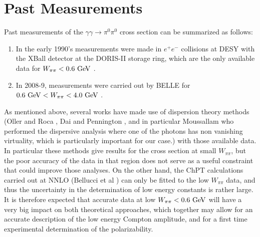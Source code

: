 \section{Past Measurements}
Past measurements of the $\gamma\gamma\to \pi^0\pi^0$ cross section can be
summarized as follows:
\begin{enumerate}
    \item 
In the early 1990's measurements were made in $e^+e^-$ collisions at DESY
with the XBall detector at the DORIS-II storage ring, which are the only
available data for $W_{\pi\pi}<0.6{\rm~ GeV}$ \cite{Marsiske:1990hx}. 
\item In 2008-9, measurements were carried out by BELLE
for $0.6{\rm~ GeV}<W_{\pi\pi}<4.0 {\rm~ GeV}$ \cite{Mori:2007bu,Uehara:2008ep,Uehara:2009cka}. 
\end{enumerate}
As mentioned above, several works have made use of dispersion theory methods
(Oller and
Roca \cite{Oller:2008kf}, Dai and Pennington \cite{Dai:2016ytz}, and
in particular Moussallam \cite{Moussallam:2013una} who performed the
dispersive analysis where one of the photons has non vanishing
virtuality, which is particularly important for our case.) with those
available data. In particular these methods give results for the cross
section at small $W_{\pi\pi}$, but the poor accuracy of the data in
that region does not serve as a useful constraint that could improve
those analyses. On the other hand, the ChPT calculations carried out
at NNLO (Bellucci et al \cite{Bellucci:1994hx,Bellucci:1994eb} ) can
only be fitted to the low $W_{\pi\pi}$ data, and thus the uncertainty
in the determination of low energy constants is rather large. It is therefore
expected that accurate data at low $W_{\pi\pi}<0.6{\rm~ GeV}$ will
have a very big impact on both theoretical approaches, which together
may allow for an accurate description of the low energy Compton
amplitude, and for a first time experimental determination of the
polarizability.
